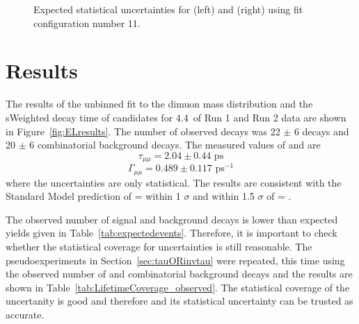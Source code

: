 {\begin{figure}[tbp]
    \caption{Expected statistical uncertainties for \tmumu (left) and \Gmumu (right) using fit configuration number 11.}
    \label{fig:exptuncert}
\end{figure}


\section{Results}
\label{sec:ELresults}

The results of the unbinned \ml fit to the dimuon mass distribution and the sWeighted decay time of \bsmumu candidates for 4.4~\fb of Run 1 and Run 2 data are shown in Figure~\ref{fig:ELresults}. The number of observed decays was 22 $\pm$ 6 \bsmumu decays and 20 $\pm$ 6 combinatorial background decays. The measured values of \tmumu and \Gmumu are
\begin{equation}
\tau_{\mu\mu} = 2.04 \pm 0.44  \text{ ps} 
\end{equation}
\begin{equation}
\Gamma_{\mu\mu} = 0.489  \pm 0.117 \text{ ps}^{-1}
\end{equation}
where the uncertainties are only statistical. The results are consistent with the Standard Model prediction of \tmumu = \tH within  1 $\sigma$ and within  1.5 $\sigma$ of \tmumu = \tL.

The observed number of signal and background decays is lower than expected yields given in Table~\ref{tab:expectedevents}.
Therefore, it is important to check whether the statistical coverage for \tmumu uncertainties is still reasonable. The pseudoexperiments in Section~\ref{sec:tauORinvtau} were repeated, this time using the observed number of \bsmumu and combinatorial background decays and the results are shown in Table~\ref{tab:LifetimeCoverage_observed}. The statistical coverage of the \tmumu uncertanity is good and therefore \tmumu and its statistical uncertainty can be trusted as accurate.


}
